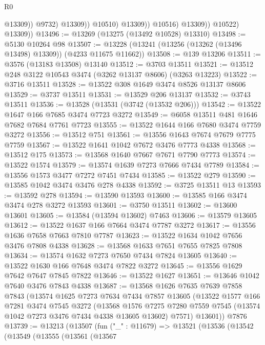 \begin{lexlean}{R0}
\begin{coremodule}
                                @13309))
                            @9732)
                          @13309))
                      @10510)
                    @13309))
                @10516)
              @13309))
          @10522)
        @13309))
@13496 := @13269 (@13275 (@13492 @10528) @13310)
@13498 := @5130 @10264 @98
@13507 := @13228 (@13241 (@13256 (@13262 (@13496 @13498) @13309)) (@4233 @11675 @11662))
@13508 := @139 @13206
@13511 := @3576 (@13183 @13508) @13140
@13512 := @3703 @13511
@13521 := @13512 @248 @3122 @10543 @3474 (@3262 @13137 @8606) (@3263 @13223)
@13522 := @3716 @13511
@13528 := @13522 @308 @1649 @3474 @8526 @13137 @8606
@13529 := @3737 @13511
@13531 := @13529 @206 @13137
@13532 := @3743 @13511
@13536 := @13528 (@13531 (@3742 (@13532 @206)))
@13542 := @13522 @1647 @166 @7685 @3474 @7723 @3272
@13549 := @6058 @13511 @481 @1646 @7682 @7684 @7761 @7723
@13555 := @13522 @1644 @166 @7680 @3474 @7759 @3272
@13556 := @13512 @751
@13561 := @13556 @1643 @7674 @7679 @7775 @7759
@13567 := @13522 @1641 @1042 @7672 @3476 @7773 @4338
@13568 := @13512 @175
@13573 := @13568 @1640 @7667 @7671 @7790 @7773
@13574 := @13522 @1574
@13579 := @13574 @1639 @7273 @7666 @7434 @7789
@13584 := @13556 @1573 @3477 @7272 @7451 @7434
@13585 := @13522 @279
@13590 := @13585 @1042 @3474 @3476 @278 @4338
@13592 := @3725 @13511 @13
@13593 := @13592 @278
@13594 := @13590 @13593
@13600 := @13585 @166 @3474 @3474 @278 @3272 @13593
@13601 := @3750 @13511
@13602 := @13600 @13601
@13605 := @13584 (@13594 @13602) @7463
@13606 := @13579 @13605
@13612 := @13522 @1637 @166 @7664 @3474 @7787 @3272
@13617 := @13556 @1636 @7658 @7663 @7810 @7787
@13623 := @13522 @1634 @1042 @7656 @3476 @7808 @4338
@13628 := @13568 @1633 @7651 @7655 @7825 @7808
@13634 := @13574 @1632 @7273 @7650 @7434 @7824 @13605
@13640 := @13522 @1630 @166 @7648 @3474 @7822 @3272
@13645 := @13556 @1629 @7642 @7647 @7845 @7822
@13646 := @13522 @1627
@13651 := @13646 @1042 @7640 @3476 @7843 @4338
@13687 := @13568
    @1626
    @7635
    @7639
    @7858
    @7843
    (@13574
      @1625
      @7273
      @7634
      @7434
      @7857
      @13605
      (@13522
        @1577
        @166
        @7281
        @3474
        @7545
        @3272
        (@13568
          @1576
          @7275
          @7280
          @7559
          @7545
          (@13574 @1042 @7273 @3476 @7434 @4338 @13605 @13602)
          @7571)
        @13601))
    @7876
@13739 := @13213
    (@13507
      (fun ("_" : @11679) =>
      @13521
        (@13536
          (@13542
            (@13549
              (@13555
                (@13561
                  (@13567

\end{coremodule}
\end{lexlean}
